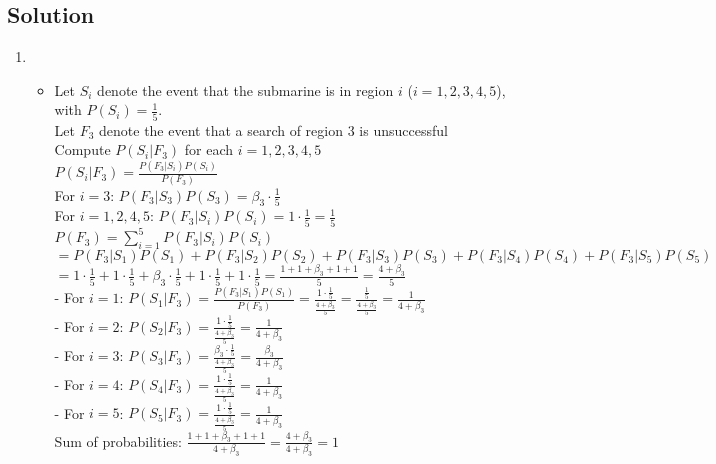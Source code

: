 \documentclass[11pt]{article}
\begin{document}
    \subsection*{Solution}
    \begin{enumerate}[label=(\alph*)]
        \item []
        \begin{itemize}
            \item[]  
Let \( S_i \) denote the event that the submarine is in region \( i \) (\( i=1,2,3,4,5 \)), with \( P(S_i) = \frac{1}{5} \). \\
Let \( F_3 \) denote the event that a search of region 3 is unsuccessful \\
Compute \( P(S_i | F_3) \) for each \( i = 1, 2, 3, 4, 5 \) \\


\(
P(S_i | F_3) = \frac{P(F_3 | S_i) P(S_i)}{P(F_3)}
\) \\


For \( i = 3 \): \( P(F_3 | S_3) P(S_3) = \beta_3 \cdot \frac{1}{5} \)\\
For \( i = 1, 2, 4, 5 \): \( P(F_3 | S_i) P(S_i) = 1 \cdot \frac{1}{5} = \frac{1}{5} \) \\

\(
P(F_3) = \sum_{i=1}^5 P(F_3 | S_i) P(S_i)
\) \\
\(
= P(F_3 | S_1) P(S_1) + P(F_3 | S_2) P(S_2) + P(F_3 | S_3) P(S_3) + P(F_3 | S_4) P(S_4) + P(F_3 | S_5) P(S_5)
\) \\
\(
= 1 \cdot \frac{1}{5} + 1 \cdot \frac{1}{5} + \beta_3 \cdot \frac{1}{5} + 1 \cdot \frac{1}{5} + 1 \cdot \frac{1}{5} = \frac{1 + 1 + \beta_3 + 1 + 1}{5} = \frac{4 + \beta_3}{5}
\) \\

- For \( i = 1 \):
\(
P(S_1 | F_3) = \frac{P(F_3 | S_1) P(S_1)}{P(F_3)} = \frac{1 \cdot \frac{1}{5}}{\frac{4 + \beta_3}{5}} = \frac{\frac{1}{5}}{\frac{4 + \beta_3}{5}} = \frac{1}{4 + \beta_3}
\) \\
- For \( i = 2 \):
\(
P(S_2 | F_3) = \frac{1 \cdot \frac{1}{5}}{\frac{4 + \beta_3}{5}} = \frac{1}{4 + \beta_3}
\) \\
- For \( i = 3 \):
\(
P(S_3 | F_3) = \frac{\beta_3 \cdot \frac{1}{5}}{\frac{4 + \beta_3}{5}} = \frac{\beta_3}{4 + \beta_3}
\) \\
- For \( i = 4 \):
\(
P(S_4 | F_3) = \frac{1 \cdot \frac{1}{5}}{\frac{4 + \beta_3}{5}} = \frac{1}{4 + \beta_3}
\) \\
- For \( i = 5 \):
\(
P(S_5 | F_3) = \frac{1 \cdot \frac{1}{5}}{\frac{4 + \beta_3}{5}} = \frac{1}{4 + \beta_3}
\) \\

Sum of probabilities:
\(
\frac{1 + 1 + \beta_3 + 1 + 1}{4 + \beta_3} = \frac{4 + \beta_3}{4 + \beta_3} = 1
\) \\
        \end{itemize}
    \end{enumerate}
\end{document}
